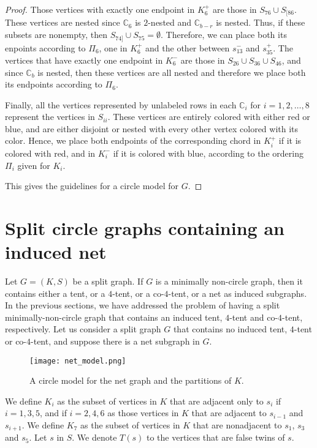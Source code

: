 \documentclass[12pt]{book}
\theoremstyle{plain}
\theoremstyle{remark}
\begin{document}
\begin{proof}
	Those vertices with exactly one endpoint in $K_6^{+}$ are those in $S_{76} \cup S_{[86}$. These vertices are nested since $\mathbb C_6$ is $2$-nested and $\mathbb C_{b-r}$ is nested. Thus, if these subsets are nonempty, then $S_{74]} \cup S_{75} = \emptyset$. Therefore, we can place both its enpoints according to $\Pi_6$, one in $K_6^{+}$ and the other between $s_{13}^{-}$ and $s_{35}^{+}$.
	The vertices that have exactly one endpoint in $K_6^{-}$ are those in $S_{26} \cup S_{36} \cup S_{46}$, and since $\mathbb C_b$ is nested, then these vertices are all nested and therefore we place both its endpoints according to $\Pi_6$.
	
Finally, all the vertices represented by unlabeled rows in each $\mathbb C_i$ for $i=1, 2, \ldots, 8$ represent the vertices in $S_{ii}$. These vertices are entirely colored with either red or blue, and are either disjoint or nested with every other vertex colored with its color. Hence, we place both endpoints of the corresponding chord in $K_i^{+}$ if it is colored with red, and in $K_i^{-}$ if it is colored with blue, according to the ordering $\Pi_i$ given for $K_i$.
	
This gives the guidelines for a circle model for $G$.

\end{proof}


\section{Split circle graphs containing an induced net} \label{sec:circle5}

Let $G=(K,S)$ be a split graph. If $G$ is a minimally non-circle graph, then it contains either a tent, or a $4$-tent, or a co-$4$-tent, or a net as induced subgraphs.
In the previous sections, we have addressed the problem of having a split minimally-non-circle graph that contains an induced tent, $4$-tent and co-$4$-tent, respectively. Let us consider a split graph $G$ that contains no induced tent, $4$-tent or co-$4$-tent, and suppose there is a net subgraph in $G$. 

\begin{figure}[h!]
\centering
\texttt{[image: net\_model.png]}
		\label{fig:net_model}    
	  \caption{A circle model for the net graph and the partitions of $K$.}
\end{figure}

We define $K_i$ as the subset of vertices in $K$ that are adjacent only to $s_i$ if $i=1,3,5$, and if $i=2,4,6$ as those vertices in $K$ that are adjacent to $s_{i-1}$ and $s_{i+1}$. We define $K_7$ as the subset of vertices in $K$ that are nonadjacent to $s_1$, $s_3$ and $s_5$.
Let $s$ in $S$. We denote $T(s)$ to the vertices that are false twins of $s$.
\end{document}
